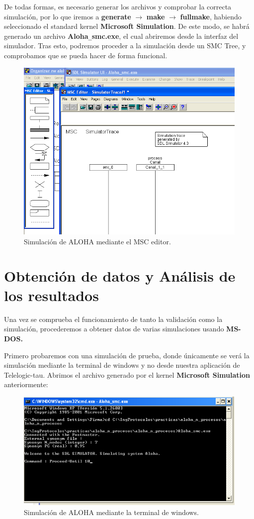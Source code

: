 \documentclass{article}
\begin{document}
\quad

De todas formas, es necesario generar los archivos y comprobar la correcta simulación, por lo que iremos a \textbf{generate} $\rightarrow$ \textbf{make} $\rightarrow$ \textbf{fullmake}, habiendo seleccionado el standard kernel \textbf{Microsoft Simulation}. De este modo, se habrá generado un archivo \textbf{Aloha}\verb|_|\textbf{smc.exe}, el cual abriremos desde la interfaz del simulador. Tras esto, podremos proceder a la simulación desde un SMC Tree, y comprobamos que se pueda hacer de forma funcional.

\begin{figure}[h]
    \centering
    \includegraphics[width=0.7\linewidth]{src/SimulatorTree.png}
    \caption{\label{fig:SimulatorTree} Simulación de ALOHA mediante el MSC editor.}
\end{figure}

\section{Obtención de datos y Análisis de los resultados}

Una vez se comprueba el funcionamiento de tanto la validación como la simulación, procederemos a obtener datos de varias simulaciones usando \textbf{MS-DOS.}

Primero probaremos con una simulación de prueba, donde únicamente se verá la simulación mediante la terminal de windows y no desde nuestra aplicación de Telelogic-tau. Abrimos el archivo generado por el kernel \textbf{Microsoft Simulation} anteriormente:

\quad

\begin{figure}[ht]
    \centering
    \includegraphics[width=0.85\linewidth]{src/cmd.png}
    \caption{\label{fig:cmdcaptura} Simulación de ALOHA mediante la terminal de windows.}
\end{figure}
\end{document}
